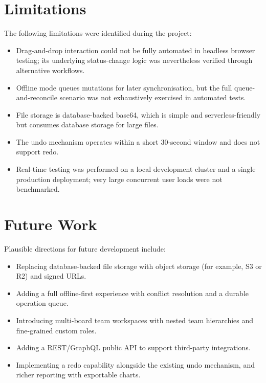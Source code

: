 \documentclass[12pt,a4paper]{report}
\begin{document}
\section{Limitations}
The following limitations were identified during the project:
\begin{itemize}
  \item Drag-and-drop interaction could not be fully automated in headless
        browser testing; its underlying status-change logic was nevertheless
        verified through alternative workflows.
  \item Offline mode queues mutations for later synchronisation, but the full
        queue-and-reconcile scenario was not exhaustively exercised in automated
        tests.
  \item File storage is database-backed base64, which is simple and
        serverless-friendly but consumes database storage for large files.
  \item The undo mechanism operates within a short 30-second window and does not
        support redo.
  \item Real-time testing was performed on a local development cluster and a
        single production deployment; very large concurrent user loads were not
        benchmarked.
\end{itemize}

\section{Future Work}
Plausible directions for future development include:
\begin{itemize}
  \item Replacing database-backed file storage with object storage (for example,
        S3 or R2) and signed URLs.
  \item Adding a full offline-first experience with conflict resolution and a
        durable operation queue.
  \item Introducing multi-board team workspaces with nested team hierarchies and
        fine-grained custom roles.
  \item Adding a REST/GraphQL public API to support third-party integrations.
  \item Implementing a redo capability alongside the existing undo mechanism, and
        richer reporting with exportable charts.
\end{itemize}
\end{document}

